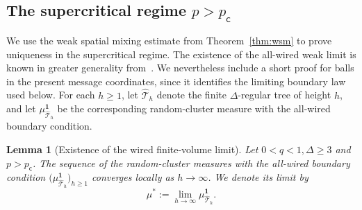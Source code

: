 \documentclass[11pt]{amsart}
\theoremstyle{plain}
\newtheorem{lemma}[theorem]{Lemma}
\theoremstyle{definition}
\theoremstyle{remark}
\newcommand{\dreg}{\widehat {\mathcal T}_h}
\newcommand{\pc}{p_{\mathsf{c}}}
\begin{document}
\subsection{The supercritical regime \texorpdfstring{$p>\pc$}{p > pc}}

We use the weak spatial mixing estimate from Theorem~\ref{thm:wsm} to prove uniqueness in the supercritical regime. The existence of the all-wired weak limit is known in greater generality from~\cite[Theorem~10.74]{grimmett2006randomcluster}. We nevertheless include a short proof for balls in the present message coordinates, since it identifies the limiting boundary law used below. For each $h\ge1$, let $\dreg$ denote the finite $\Delta$-regular tree of height $h$, and let $\mu_{\dreg}^{\mathbf 1}$ be the corresponding random-cluster measure with the all-wired boundary condition.

\begin{lemma}[Existence of the wired finite-volume limit]
\label{lem:wired-limit}
Let $0<q<1, \Delta\ge3$ and $p>\pc$. The sequence of the random-cluster measures with the all-wired boundary condition $\bigl(\mu_{\dreg}^{\mathbf 1}\bigr)_{h\ge1}$ converges locally as $h\to\infty$. We denote its limit by
\[
    \mu^*
    :=
    \lim_{h\to\infty}
    \mu_{\dreg}^{\mathbf 1}.
\]
\end{lemma}
\end{document}
